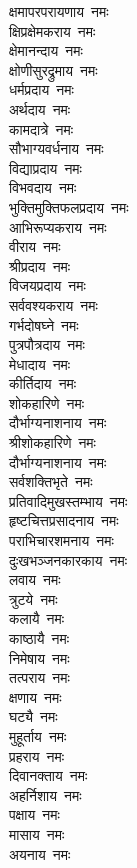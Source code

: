 \begin{multicols}{2}
\begin{flushleft}
क्षमापरपरायणाय~नमः\\
क्षिप्रक्षेमकराय~नमः\\
क्षेमानन्दाय~नमः\\
क्षोणीसुरद्रुमाय~नमः\\
धर्मप्रदाय~नमः\\
अर्थदाय~नमः\\
कामदात्रे~नमः\\
सौभाग्यवर्धनाय~नमः\\
विद्याप्रदाय~नमः\\
विभवदाय~नमः\hfill{}\\
भुक्तिमुक्तिफलप्रदाय~नमः\\
आभिरूप्यकराय~नमः\\
वीराय~नमः\\
श्रीप्रदाय~नमः\\
विजयप्रदाय~नमः\\
सर्ववश्यकराय~नमः\\
गर्भदोषघ्ने~नमः\\
पुत्रपौत्रदाय~नमः\\
मेधादाय~नमः\\
कीर्तिदाय~नमः\hfill{}\\
शोकहारिणे~नमः\\
दौर्भाग्यनाशनाय~नमः\\
श्रीशोकहारिणे~नमः\\
दौर्भाग्यनाशनाय~नमः\\
सर्वशक्तिभृते~नमः\\
प्रतिवादिमुखस्तम्भाय~नमः\\
हृष्टचित्तप्रसादनाय~नमः\\
पराभिचारशमनाय~नमः\\
दुःखभञ्जनकारकाय~नमः\\
लवाय~नमः\hfill{}\\
त्रुटये~नमः\\
कलायै~नमः\\
काष्ठायै~नमः\\
निमेषाय~नमः\\
तत्पराय~नमः\\
क्षणाय~नमः\\
घट्यै~नमः\\
मुहूर्ताय~नमः\\
प्रहराय~नमः\\
दिवानक्ताय~नमः\hfill{}\\
अहर्निशाय~नमः\\
पक्षाय~नमः\\
मासाय~नमः\\
अयनाय~नमः\\

\end{flushleft}
\end{multicols}
